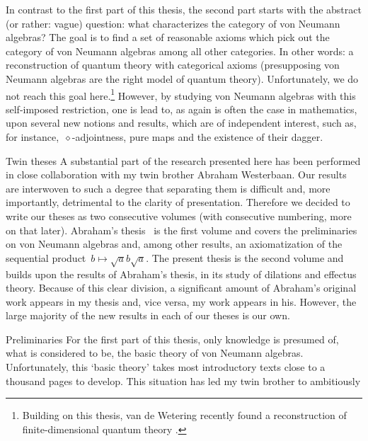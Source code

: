 \begin{parsec}
\begin{point}
\begin{point}
In contrast to the first part of this thesis,
    the second part starts
    with the abstract (or rather: vague) question:
    what characterizes the category of von Neumann algebras?
The goal is to find a set of reasonable axioms
    which pick out the category of von Neumann algebras
    among all other categories.
In other words: a reconstruction of quantum theory with categorical axioms
    (presupposing von Neumann algebras are the right model of quantum theory).
    Unfortunately, we do not reach this goal here.\footnote{%
        Building on this thesis,
            van de Wetering recently found a reconstruction
            of finite-dimensional quantum theory \cite{wetering}.}
However, by studying von Neumann algebras
    with this self-imposed restriction,
    one is lead to, as again is often the case in mathematics,
    upon several new notions and results,
    which are of independent interest,
    such as, for instance,~$\diamond$-adjointness,
    pure maps and the existence of their dagger.
\end{point}
\end{point}
\begin{point}{Twin theses}%
A substantial part of the research presented here
    has been performed in close collaboration with
    my twin brother Abraham Westerbaan.
Our results are interwoven to such a degree
    that separating them is difficult
    and, more importantly, detrimental to the clarity of presentation.
Therefore we decided to write our theses as two consecutive volumes
    (with consecutive numbering, more on that later).
    Abraham's thesis~\cite{bram} is the first volume
    and covers the preliminaries on von Neumann
    algebras and, among other results, an axiomatization of
        the sequential product~$b\mapsto \sqrt{a}b\sqrt{a}$.
The present thesis is the second volume and builds upon
    the results of Abraham's thesis,
            in its study of dilations and effectus theory.
Because of this clear division,
    a significant amount of Abraham's original work appears in my thesis
        and, vice versa, my work appears in his.
However, the large majority of the
        new results in each of our theses is our own.
\end{point}
\begin{point}{Preliminaries}%
For the first part of this thesis,
    only knowledge is presumed of, what is considered to be,
    the basic theory of von Neumann algebras.
Unfortunately, this `basic theory' takes most introductory texts
    close to a thousand pages to develop.
This situation has led my twin brother to ambitiously

\end{point}
\end{parsec}
